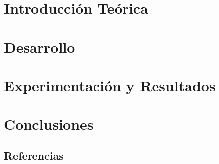 \documentclass[12pt,a4paper]{report}
\begin{document}


\tableofcontents{}

\chapter{Introducción Teórica}



\chapter{Desarrollo}



\chapter{Experimentación y Resultados}




%

\chapter{Conclusiones}




%

\section{Referencias}


\end{document}
